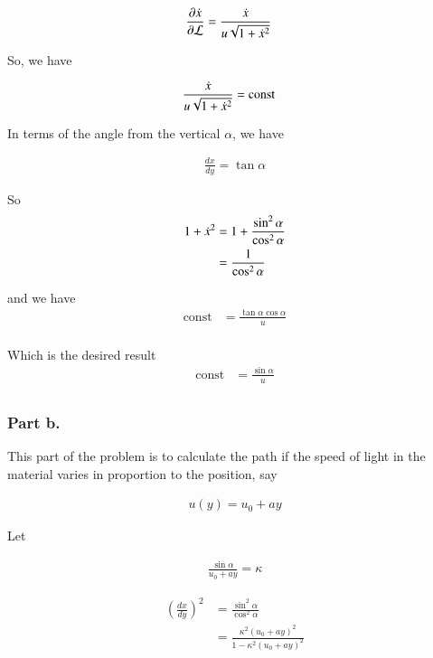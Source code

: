 \documentclass{article}
\begin{document}
\begin{align*}
\frac{\partial{\dot{x}}}{\partial {\mathcal{L}}} &= \frac{\dot{x}}{u \sqrt{1 + \dot{x}^2} }
\end{align*}

So, we have

\begin{align*}
\frac{\dot{x}}{u \sqrt{1 + \dot{x}^2} } &= \text{const}
\end{align*}

In terms of the angle from the vertical $\alpha$, we have

\begin{align*}
\frac{dx}{dy} = \tan\alpha 
\end{align*}

So
\begin{align*}
1 + \dot{x}^2 
&= 1 + \frac{\sin^2\alpha}{\cos^2\alpha} \\
&= \frac{1}{\cos^2\alpha} \\
\end{align*}

and we have
\begin{align*}
\text{const}
&= 
\frac{\tan\alpha \cos\alpha}{u}  \\
\end{align*}

Which is the desired result
\begin{align*}
\text{const} &= \frac{\sin\alpha}{u} \\
\end{align*}

\subsubsection{ Part b. }

This part of the problem is to calculate the path if the speed of light
in the material varies in proportion to the position, say

\begin{align*}
u(y) = u_0 + a y
\end{align*}

Let

\begin{align*}
\frac{\sin\alpha}{u_0 + a y} = \kappa
\end{align*}

\begin{align*}
\left( \frac{dx}{dy} \right)^2 
&= \frac{\sin^2 \alpha}{\cos^2 \alpha} \\
&= 
\frac{\kappa^2 (u_0 + a y)^2}{ 1 - \kappa^2 (u_0 + a y)^2 } \\
\end{align*}
\end{document}
